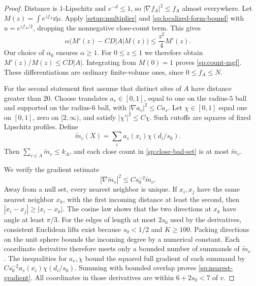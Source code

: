 \begin{proof}
Distance is $1$-Lipschitz and $e^{-d}\le1$, so
$|\nabla f_A|^2\le f_A$ almost everywhere.  Let
$M(z)=\int e^{zf_A}\dd\mu$.  Apply
\eqref{setup:multiplier} and \eqref{sp:localized-form-bound}
with $u=e^{zf_A/2}$, dropping the nonnegative close-count term.
This gives
\[
 \alpha\bigl(M'(z)-CD|A|M(z)\bigr)
       \le\frac{z^2}{4}M'(z).
\]
Our choice of $\alpha_0$ ensures $\alpha\ge1$.  For $0\le z\le1$
we therefore obtain $M'(z)/M(z)\le CD|A|$.  Integrating from
$M(0)=1$ proves \eqref{sp:count-mgf}.  These differentiations are
ordinary finite-volume ones, since $0\le f_A\le N$.

For the second statement first assume that distinct sites of $A$ have
distance greater than $20$.  Choose translates $a_v\in[0,1]$, equal
to one on the radius-$5$ ball and supported on the radius-$6$ ball,
with $|\nabla a_v|^2\le Ca_v$.  Let $\chi\in[0,1]$ equal one on
$[0,1]$, zero on $[2,\infty)$, and satisfy $|\chi'|^2\le C\chi$.
Such cutoffs are squares of fixed Lipschitz profiles.  Define
\[
 \widetilde m_v(X)=\sum_i a_v(x_i)\chi(d_i/s_0).
\]
Then $\sum_{v\in A}\widetilde m_v\le k_A$, and each close count
in \eqref{sp:close-bad-set} is at most $\widetilde m_v$.

We verify the gradient estimate
\begin{equation}\label{sp:nearest-gradient}
 |\nabla\widetilde m_v|^2\le Cs_0^{-2}\widetilde m_v.
\end{equation}
Away from a null set, every nearest neighbor is unique.  If $x_i,x_j$
have the same nearest neighbor $x_k$, with the first incoming distance
at least the second, then $|x_i-x_j|\ge|x_i-x_k|$.
The cosine law shows that the two directions at $x_k$ have angle at
least $\pi/3$.  For the edges of length at most $2s_0$ used by the
derivatives, consistent Euclidean lifts exist because $s_0<1/2$ and
$K\ge100$.  Packing directions on the unit sphere bounds the incoming
degree by a numerical constant.  Each coordinate derivative therefore
meets only a bounded number of summands of $\widetilde m_v$.
The inequalities for $a_v,\chi$ bound the squared full gradient of
each summand by $Cs_0^{-2}a_v(x_i)\chi(d_i/s_0)$.
Summing with bounded overlap proves \eqref{sp:nearest-gradient}.
All coordinates in those derivatives are within $6+2s_0<7$ of $v$.


\end{proof}
